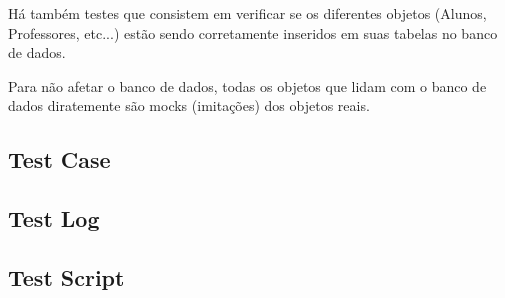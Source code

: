 \documentclass[12pt,letterpaper]{article}
\begin{document}
Há também testes que consistem em verificar se os diferentes objetos (Alunos, Professores, etc...) estão sendo corretamente inseridos em suas tabelas no banco de dados.

Para não afetar o banco de dados, todas os objetos que lidam com o banco de dados diratemente são mocks (imitações) dos objetos reais.

\subsection{Test Case}
\subsection{Test Log}
\subsection{Test Script}




%
\end{document}
